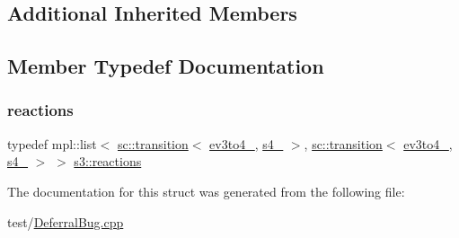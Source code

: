 \subsection*{Additional Inherited Members}


\subsection{Member Typedef Documentation}
\mbox{\label{structs3_a8e624263baefdc4a05a3ccc89d5ae798}} 
\subsubsection{\texorpdfstring{reactions}{reactions}}
{\footnotesize\ttfamily typedef mpl\+::list$<$ \mbox{\hyperlink{classboost_1_1statechart_1_1transition}{sc\+::transition}}$<$ \mbox{\hyperlink{structev3to4__1}{ev3to4\+\_}}, \mbox{\hyperlink{structs4__1}{s4\+\_}} $>$, \mbox{\hyperlink{classboost_1_1statechart_1_1transition}{sc\+::transition}}$<$ \mbox{\hyperlink{structev3to4__2}{ev3to4\+\_}}, \mbox{\hyperlink{structs4__2}{s4\+\_}} $>$ $>$ \mbox{\hyperlink{structs3_a8e624263baefdc4a05a3ccc89d5ae798}{s3\+::reactions}}}



The documentation for this struct was generated from the following file\+:\begin{DoxyCompactItemize}
\item 
test/\mbox{\hyperlink{_deferral_bug_8cpp}{Deferral\+Bug.\+cpp}}\end{DoxyCompactItemize}
